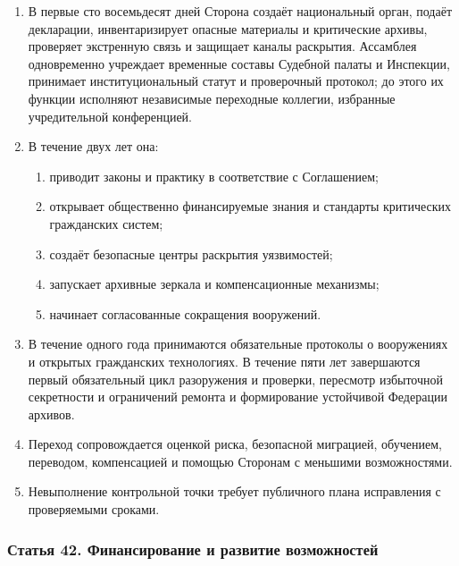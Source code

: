 \documentclass[
  russian,
  11pt,
  a4paper,
]{article}
\providecommand{\tightlist}{%
  \setlength{\itemsep}{0pt}\setlength{\parskip}{0pt}}
\begin{document}
\begin{enumerate}
\def\labelenumi{\arabic{enumi}.}
\tightlist
\item
  В первые сто восемьдесят дней Сторона создаёт национальный орган,
  подаёт декларации, инвентаризирует опасные материалы и критические
  архивы, проверяет экстренную связь и защищает каналы раскрытия.
  Ассамблея одновременно учреждает временные составы Судебной палаты и
  Инспекции, принимает институциональный статут и проверочный протокол;
  до этого их функции исполняют независимые переходные коллегии,
  избранные учредительной конференцией.
\item
  В течение двух лет она:

  \begin{enumerate}
  \def\labelenumii{\arabic{enumii}.}
  \tightlist
  \item
    приводит законы и практику в соответствие с Соглашением;
  \item
    открывает общественно финансируемые знания и стандарты критических
    гражданских систем;
  \item
    создаёт безопасные центры раскрытия уязвимостей;
  \item
    запускает архивные зеркала и компенсационные механизмы;
  \item
    начинает согласованные сокращения вооружений.
  \end{enumerate}
\item
  В течение одного года принимаются обязательные протоколы о вооружениях
  и открытых гражданских технологиях. В течение пяти лет завершаются
  первый обязательный цикл разоружения и проверки, пересмотр избыточной
  секретности и ограничений ремонта и формирование устойчивой Федерации
  архивов.
\item
  Переход сопровождается оценкой риска, безопасной миграцией, обучением,
  переводом, компенсацией и помощью Сторонам с меньшими возможностями.
\item
  Невыполнение контрольной точки требует публичного плана исправления с
  проверяемыми сроками.
\end{enumerate}

\subsubsection{Статья 42. Финансирование и развитие
возможностей}\label{ux441ux442ux430ux442ux44cux44f-42-ux444ux438ux43dux430ux43dux441ux438ux440ux43eux432ux430ux43dux438ux435-ux438-ux440ux430ux437ux432ux438ux442ux438ux435-ux432ux43eux437ux43cux43eux436ux43dux43eux441ux442ux435ux439}
\end{document}
